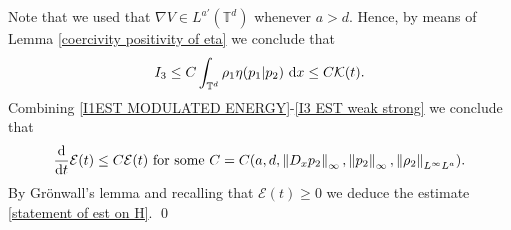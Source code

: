 \documentclass[11pt,reqno]{amsart}
\numberwithin{equation}{section}
\def\dd{{\rm d}}
\begin{document}
Note that we used that $\nabla V\in L^{a'}(\mathbb{T}^{d})$ whenever $a>d$. 
Hence, by means of Lemma \ref{coercivity positivity of eta} we conclude that 
\begin{align}
I_{3}\leq C\int_{\mathbb{T}^{d}}\rho_{1}\eta(p_{1}\vert p_{2})\ \dd x\leq C\mathcal{K}(t).  
\label{I3 EST weak strong}     
\end{align}
Combining \eqref{I1EST MODULATED ENERGY}-\eqref{I3 EST weak strong} we conclude that 
\begin{align*}
\frac{\dd}{\dd t}\mathcal{E}(t)\leq C\mathcal{E}(t) \ \mbox{for some}\ C=C(a,d,\left\Vert D_{x}p_{2}\right\Vert_{\infty},\left\Vert p_{2}\right\Vert_{\infty},\left\Vert \rho_{2}\right\Vert_{L^{\infty}L^{a}}).    
\end{align*}
By Gr\"onwall's lemma and recalling that $\mathcal{E}(t)\geq 0$ we deduce the estimate \eqref{statement of est on H}. 
\qed
\end{document}
